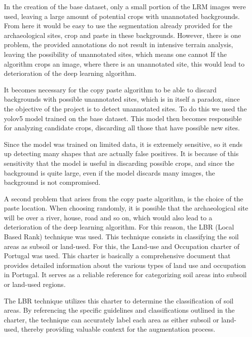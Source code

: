 In the creation of the base dataset, only a small portion of the LRM images were used, leaving a large amount of potential crops with unannotated backgrounds. From here it would be easy to use the segmentation already provided for the archaeological sites, crop and paste in these backgrounds. However, there is one problem, the provided annotations do not result in intensive terrain analysis, leaving the possibility of unannotated sites, which means one cannot If the algorithm crops an image, where there is an unannotated site, this would lead to deterioration of the deep learning algorithm.

It becomes necessary for the copy paste algorithm to be able to discard backgrounds with possible unannotated sites, which is in itself a paradox, since the objective of the project is to detect unannotated sites. To do this we used the yolov5 model trained on the base dataset. This model then becomes responsible for analyzing candidate crops, discarding all those that have possible new sites. 

Since the model was trained on limited data, it is extremely sensitive, so it ends up detecting many shapes that are actually false positives. It is because of this sensitivity that the model is useful in discarding possible crops, and since the background is quite large, even if the model discards many images, the background is not compromised.

A second problem that arises from the copy paste algorithm, is the choice of the paste location. When choosing randomly, it is possible that the archaeological site will be over a river, house, road and so on, which would also lead to a deterioration of the deep learning algorithm. For this reason, the LBR (Local Based Rank) technique was used. This technique consists in classifying the soil areas as subsoil or land-used. For this, the Land-use and Occupation charter of Portugal was used. This charter is basically a comprehensive document that provides detailed information about the various types of land use and occupation in Portugal. It serves as a reliable reference for categorizing soil areas into subsoil or land-used regions.

The LBR technique utilizes this charter to determine the classification of soil areas. By referencing the specific guidelines and classifications outlined in the charter, the technique can accurately label each area as either subsoil or land-used, thereby providing valuable context for the augmentation process.

